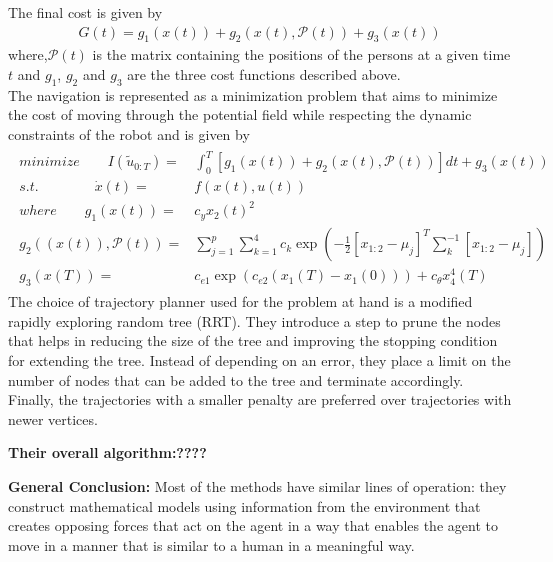 The final cost is given by 
\begin{align}
G(t) = g_{1}(x(t)) + g_{2}(x(t), \mathcal{P}(t)) + g_{3}(x(t))
\end{align}
where,$\mathcal{P}(t)$ is the matrix containing the positions of the persons at a given time $t$ and $g_{1}$, $g_{2}$ and $g_{3}$ are the three cost functions described above.\\
The navigation is represented as a minimization problem that aims to minimize the cost of moving through the potential field while respecting the dynamic constraints of the robot and is given by
\begin{align}
\begin{split}
minimize \qquad I(\tilde{u}_{0:T}) = &\int_{0}^{T} [g_{1}(x(t)) + g_{2}(x(t), \mathcal{P}(t))]dt + g_{3}(x(t))\\
s.t. \qquad \qquad \dot{x}(t) = & f(x(t),u(t)) \\
where \qquad g_{1}(x(t)) = &c_{y}x_{2}(t)^{2}\\
        g_{2}((x(t)), \mathcal{P}(t)) = &\sum_{j=1}^{p} \sum_{k=1}^{4} c_{k}\exp(-\frac{1}{2}[x_{1:2} - \mu_{j}]^{T}\sum^{-1}_{k}[x_{1:2} - \mu_{j}])\\
        g_{3}(x(T)) = & c_{e1}\exp(c_{e2}(x_{1}(T) - x_{1}(0))) + c_{\theta}x_{4}^{4}(T)
\end{split}
\end{align}
The choice of trajectory planner used for the problem at hand is a modified rapidly exploring random tree (RRT). They introduce a step to prune the nodes that helps in reducing the size of the tree and improving the stopping condition for extending the tree. Instead of depending on an error, they place a limit on the number of nodes that can be added to the tree and terminate accordingly. Finally, the trajectories with a smaller penalty are preferred over trajectories with newer vertices.

\textbf{Their overall algorithm:????}

\textbf{General Conclusion:}
Most of the methods have similar lines of operation: they construct mathematical models using information from the environment that creates opposing forces that act on the agent in a way that enables the agent to move in a manner that is similar to a human in a meaningful way.






